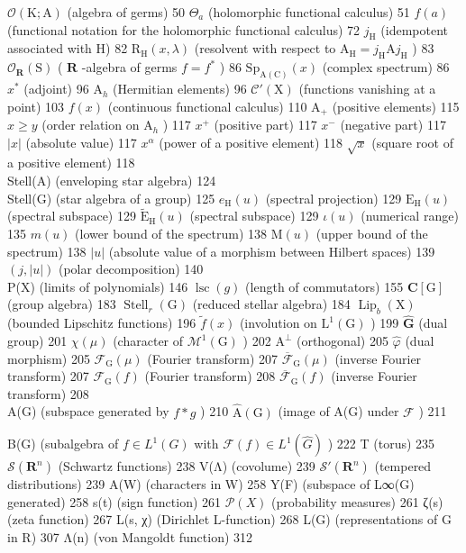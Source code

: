 \(\mathcal{O}(\mathrm{K};\mathrm{A})\) (algebra of germs) 50 \(\Theta_{a}\) (holomorphic functional calculus) 51 \(f(a)\) (functional notation for the holomorphic functional calculus) 72 \(j_{\mathrm{H}}\) (idempotent associated with H) 82 \(\mathrm{R_H}(x,\lambda)\) (resolvent with respect to \(\mathrm{A_H} = j_{\mathrm{H}}\mathrm{A}j_{\mathrm{H}}\) ) 83 \(\mathcal{O}_{\mathbf{R}}(\mathrm{S})\) ( \(\mathbf{R}\) -algebra of germs \(f = f^{*}\) ) 86 \(\mathrm{Sp}_{\mathrm{A(C)}}(x)\) (complex spectrum) 86 \(x^{*}\) (adjoint) 96 \(\mathrm{A}_h\) (Hermitian elements) 96 \(\mathcal{C}'(\mathrm{X})\) (functions vanishing at a point) 103 \(f(x)\) (continuous functional calculus) 110 \(\mathrm{A}_{+}\) (positive elements) 115 \(x \geqslant y\) (order relation on \(\mathrm{A}_h\) ) 117 \(x^{+}\) (positive part) 117 \(x^{-}\) (negative part) 117 \(|x|\) (absolute value) 117 \(x^{\alpha}\) (power of a positive element) 118 \(\sqrt{x}\) (square root of a positive element) 118\\
Stell(A) (enveloping star algebra) 124\\
Stell(G) (star algebra of a group) 125 \(e_{\mathrm{H}}(u)\) (spectral projection) 129 \(\mathrm{E_H}(u)\) (spectral subspace) 129 \(\widetilde{\mathrm{E}}_{\mathrm{H}}(u)\) (spectral subspace) 129 \(\iota(u)\) (numerical range) 135 \(m(u)\) (lower bound of the spectrum) 138 \(\mathrm{M}(u)\) (upper bound of the spectrum) 138 \(|u|\) (absolute value of a morphism between Hilbert spaces) 139 \((j,|u|)\) (polar decomposition) 140\\
P(X) (limits of polynomials) 146 \(\operatorname{lsc}(g)\) (length of commutators) 155 \(\mathbf{C}[\mathrm{G}]\) (group algebra) 183 \(\operatorname{Stell}_r(\mathrm{G})\) (reduced stellar algebra) 184 \(\operatorname{Lip}_b(\mathrm{X})\) (bounded Lipschitz functions) 196 \(\widetilde{f}(x)\) (involution on \(\mathrm{L}^1 (\mathrm{G})\) ) 199 \(\widehat{\mathbf{G}}\) (dual group) 201 \(\chi (\mu)\) (character of \(\mathcal{M}^1 (\mathrm{G})\) ) 202 \(\mathrm{A}^{\perp}\) (orthogonal) 205 \(\widehat{\varphi}\) (dual morphism) 205 \(\mathcal{F}_{\mathrm{G}}(\mu)\) (Fourier transform) 207 \(\overline{\mathcal{F}}_{\mathrm{G}}(\mu)\) (inverse Fourier transform) 207 \(\mathcal{F}_{\mathrm{G}}(f)\) (Fourier transform) 208 \(\overline{\mathcal{F}}_{\mathrm{G}}(f)\) (inverse Fourier transform) 208\\
A(G) (subspace generated by \(f*g\) ) 210 \(\widehat{\mathrm{A}}(\mathrm{G})\) (image of A(G) under \(\mathcal{F}\) ) 211

B(G) (subalgebra of \(f \in L^{1}(G)\) with \(\mathcal{F}(f) \in L^{1}(\widehat{G})\) ) 222 T (torus) 235 \(\mathcal{S}(\mathbf{R}^{n})\) (Schwartz functions) 238 V(Λ) (covolume) 239 \(\mathcal{S}'(\mathbf{R}^{n})\) (tempered distributions) 239 A(W) (characters in W) 258 Y(F) (subspace of L∞(G) generated) 258 s(t) (sign function) 261 \(\mathcal{P}(X)\) (probability measures) 261 ζ(s) (zeta function) 267 L(s, χ) (Dirichlet L-function) 268 L(G) (representations of G in R) 307 Λ(n) (von Mangoldt function) 312

